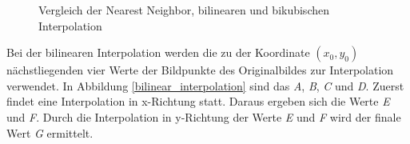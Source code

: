 \begin{figure}[htb]
\centering
{}
\caption{Vergleich der Nearest Neighbor, bilinearen und bikubischen Interpolation}
\label{interpolation}
\end{figure}

Bei der bilinearen Interpolation werden die zu der Koordinate $(x_0, y_0)$ nächstliegenden vier Werte der Bildpunkte des Originalbildes zur Interpolation verwendet\cite[S.387]{burger:bv}. In Abbildung \ref{bilinear_interpolation} sind das \textit{A}, \textit{B}, \textit{C} und \textit{D}. Zuerst findet eine Interpolation in x-Richtung statt. Daraus ergeben sich die Werte \textit{E} und \textit{F}. Durch die Interpolation in y-Richtung der Werte \textit{E} und \textit{F} wird der finale Wert \textit{G} ermittelt.

